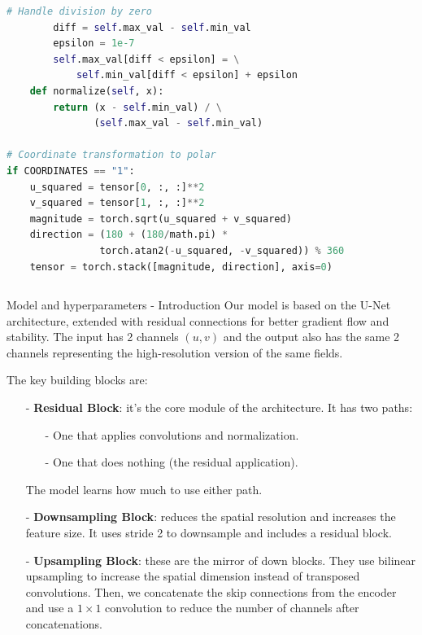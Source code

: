 \documentclass[footline=authortitle]{beamer}
\begin{document}
\begin{frame}[fragile]
\begin{columns}
\begin{column}{0.6\textwidth}
\begin{lstlisting}[language=Python, basicstyle=\ttfamily\tiny]
        # Handle division by zero
        diff = self.max_val - self.min_val
        epsilon = 1e-7
        self.max_val[diff < epsilon] = \
            self.min_val[diff < epsilon] + epsilon
    def normalize(self, x):
        return (x - self.min_val) / \
               (self.max_val - self.min_val)

# Coordinate transformation to polar
if COORDINATES == "1":
    u_squared = tensor[0, :, :]**2
    v_squared = tensor[1, :, :]**2
    magnitude = torch.sqrt(u_squared + v_squared)
    direction = (180 + (180/math.pi) * 
                torch.atan2(-u_squared, -v_squared)) % 360
    tensor = torch.stack([magnitude, direction], axis=0)
\end{lstlisting}
\end{column}
\end{columns}

\end{frame}



\begin{frame}{Model and hyperparameters - Introduction}
\justifying
\footnotesize
    Our model is based on the U-Net architecture, extended with residual connections for better gradient flow and stability.
    The input has 2 channels $(u,v)$ and the output also has the same 2 channels representing the high-resolution version of the same fields.

    The key building blocks are:
    \begin{itemize}
    \justifying
        \item[-] \textbf{Residual Block}: it's the core module of the architecture. It has two paths:\begin{itemize}
            \item[-] One that applies convolutions and normalization.
            \item[-] One that does nothing (the residual application).
        \end{itemize}
        The model learns how much to use either path.
        \item[-] \textbf{Downsampling Block}: reduces the spatial resolution and increases the feature size. It uses stride 2 to downsample and includes a residual block.
        \item[-] \textbf{Upsampling Block}: these are the mirror of down blocks. They use bilinear upsampling to increase the spatial dimension instead of transposed convolutions. Then, we concatenate  the skip connections from the encoder and use a $1\times 1$ convolution to reduce the number of channels after concatenations.
    \end{itemize}
    \end{frame}
\end{document}
